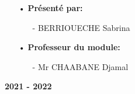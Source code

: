 \documentclass[a4paper,12pt]{report}
\begin{document}
\begin{itemize}
\item[•]\textbf{Présenté par:}
\setlength{\parskip}{3mm}

\begin{itemize} \item[-] BERRIOUECHE Sabrina
\end{itemize}
\setlength{\parskip}{3mm}
\item[•]\textbf{Professeur du module:}
\setlength{\parskip}{3mm}

\begin{itemize} \item[-] Mr CHAABANE Djamal
\end{itemize}


\end{itemize}
\vspace{5\baselineskip}
\begin{center}
\textbf{2021 - 2022}
\end{center}
\end{document}
